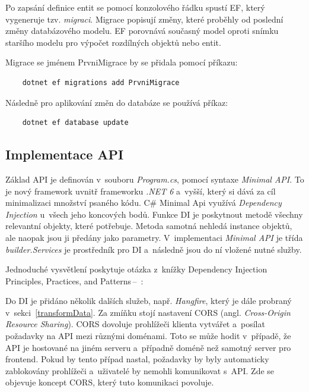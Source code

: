 Po zapsání definice entit se pomocí konzolového řádku spustí EF, který vygeneruje tzv. \emph{migraci}. Migrace popisují změny, které proběhly od poslední změny databázového modelu. EF porovnává současný model oproti snímku staršího modelu pro výpočet rozdílných objektů nebo entit. \cite{EFMigrations} 

Migrace se jménem PrvniMigrace by se přidala pomocí příkazu: 
\begin{verbatim}
    dotnet ef migrations add PrvniMigrace
\end{verbatim}
Následně pro aplikování změn do databáze se používá příkaz:
\begin{verbatim}
    dotnet ef database update
\end{verbatim}
\subsection{Implementace API}
\label{apiimplementation}
Základ API je definován v~souboru \emph{Program.cs}, pomocí syntaxe \emph{Minimal API}. To je nový framework uvnitř frameworku \emph{.NET 6} a~vyšší, který si dává za cíl minimalizaci množství psaného kódu. C\# Minimal Api využívá \emph{Dependency Injection} u~všech jeho koncových bodů. Funkce DI je poskytnout metodě všechny relevantní objekty, které potřebuje. Metoda samotná nehledá instance objektů, ale naopak jsou ji předány jako parametry. V~implementaci \emph{Minimal API} je třída \emph{builder.Services} je prostředník pro DI a~následně jsou do ní vložené nutné služby.
   
Jednoduché vysvětlení poskytuje otázka z~knížky Dependency Injection Principles, Practices, and Patterns\,--\, \cite{DI}:
\begin{quote}
\end{quote}
\noindent Do DI je přidáno několik dalších služeb, např. \emph{Hangfire}, který je dále probraný v~sekci~\ref{transformData}. Za zmíňku stojí nastavení CORS (angl. \emph{Cross-Origin Resource Sharing}). CORS dovoluje prohlížeči klienta vytvářet a~posílat požadavky na API mezi různými doménami. Toto se může hodit v~případě, že API je hostované na jiném serveru a~případně doméně než samotný server pro frontend. Pokud by tento případ nastal, požadavky by byly automaticky zablokovány prohlížeči a~uživatelé by nemohli komunikovat s~API. Zde se objevuje koncept CORS, který tuto komunikaci povoluje. \cite{CORS}

